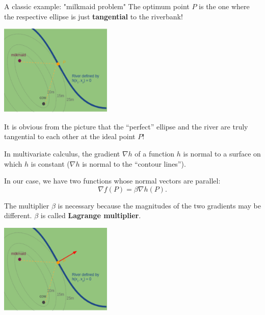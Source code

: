 \documentclass[11pt,compress,t,notes=noshow, xcolor=table]{beamer}
\begin{document}
\begin{vbframe}{A classic example: "milkmaid problem"}
The optimum point $P$ is the one where the respective ellipse is just \textbf{tangential} to the riverbank! 

\begin{center}
	\includegraphics[width = 0.4\textwidth]{figure_man/milkmaid4.png}
\end{center}

It is obvious from the picture that the \enquote{perfect} ellipse and the river are truly tangential to each other at the ideal point $P$! 


\framebreak 

In multivariate calculus, the gradient $\nabla h$ of a function $h$ is normal to a surface on which $h$ is constant ($\nabla h$ is normal to the \enquote{contour lines}). 

\vspace*{0.2cm}

In our case, we have two functions whose normal vectors are parallel: 
$$
	\nabla f(P) = \beta \nabla h(P). 
$$

The multiplier $\beta$ is necessary because the magnitudes of the two gradients may be different. $\beta$ is called \textbf{Lagrange multiplier}. 

\begin{center}
	\includegraphics[width = 0.4\textwidth]{figure_man/milkmaid5.png}
\end{center}

\end{vbframe}
\end{document}
